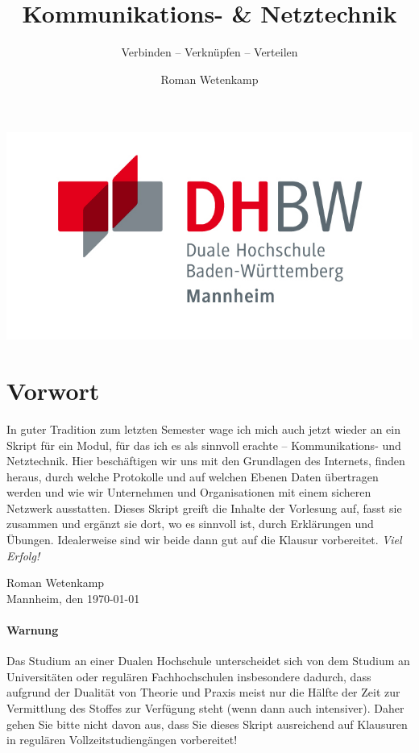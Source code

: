 \documentclass[11pt,a4paper]{scrartcl}
\author{Roman Wetenkamp}
\title{Kommunikations- \& Netztechnik}
\subtitle{Verbinden -- Verknüpfen -- Verteilen}
\begin{document}
\vspace{3cm}
\maketitle
\begin{center}
\includegraphics[scale=0.7]{DHBW.jpg}
\end{center}
\pagebreak
\tableofcontents
\pagebreak
\section*{Vorwort}
In guter Tradition zum letzten Semester wage ich mich auch jetzt wieder an ein Skript für ein Modul, für das ich es als sinnvoll erachte -- Kommunikations- und Netztechnik. Hier beschäftigen wir uns mit den Grundlagen des Internets, finden heraus, durch welche Protokolle und auf welchen Ebenen Daten übertragen werden und wie wir Unternehmen und Organisationen mit einem sicheren Netzwerk ausstatten. Dieses Skript greift die Inhalte der Vorlesung auf, fasst sie zusammen und ergänzt sie dort, wo es sinnvoll ist, durch Erklärungen und Übungen. Idealerweise sind wir beide dann gut auf die Klausur vorbereitet.
\textit{Viel Erfolg!}  \\
\begin{flushright}
Roman Wetenkamp \\
Mannheim, den \today
\end{flushright}  
\vfill
\paragraph{Warnung}
Das Studium an einer Dualen Hochschule unterscheidet sich von dem Studium an Universitäten oder regulären Fachhochschulen insbesondere dadurch, dass aufgrund der Dualität von Theorie und Praxis meist nur die Hälfte der Zeit zur Vermittlung des Stoffes zur Verfügung steht (wenn dann auch intensiver). Daher gehen Sie bitte nicht davon aus, dass Sie dieses Skript ausreichend auf Klausuren in regulären Vollzeitstudiengängen vorbereitet!
\end{document}
